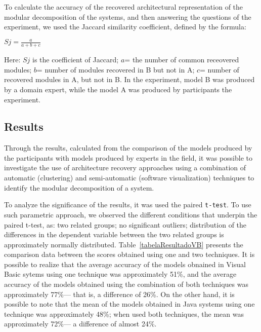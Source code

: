 {To calculate the accuracy of the recovered architectural representation of the modular decomposition of the systems, and then answering the questions of the experiment, we used the Jaccard similarity coefficient, defined by the formula:

\begin{center}
	$Sj= \frac{a}{a+b+c}$
\end{center}

Here: $Sj$ is the coefficient of Jaccard; $a$= the number of common receovered 
modules; $b$= number of modules recovered in B but not in A; $c$= number of recovered modules in A, but not in B. In the experiment, model B was produced by a domain expert, while the model A was produced by  participants  the experiment.

\subsection{Results}%

Through the results, calculated from the comparison of the models produced by the participants with models produced by experts in the field, 
it was possible to investigate the use of architecture recovery approaches using a combination of automatic (clustering) and semi-automatic (software visualization) 
techniques to identify the modular decomposition of a system.  

To analyze the significance of the results, it was used the paired \texttt{t-test}. To use such parametric approach, we observed the different conditions that underpin the paired t-test, as: two related groups; no significant outliers; distribution of the differences in the dependent variable between the two related groups is approximately normally distributed. Table~\ref{tabelaResultadoVB} presents the comparison data between the scores obtained using one and two techniques. It is possible to realize that the average accuracy of the models obnained in Visual Basic sytems using one technique 
was approximately 51\%, and the average accuracy of the models obtained using the combination of both techniques was approximately 77\%--- that is, a difference of 26\%. 
On the other hand, it is possible to note that the mean of the models obtained in Java systems using one technique was approximately 48\%; when used both techniques, 
the mean was approximately 72\%--- a difference of almost 24\%.

}
